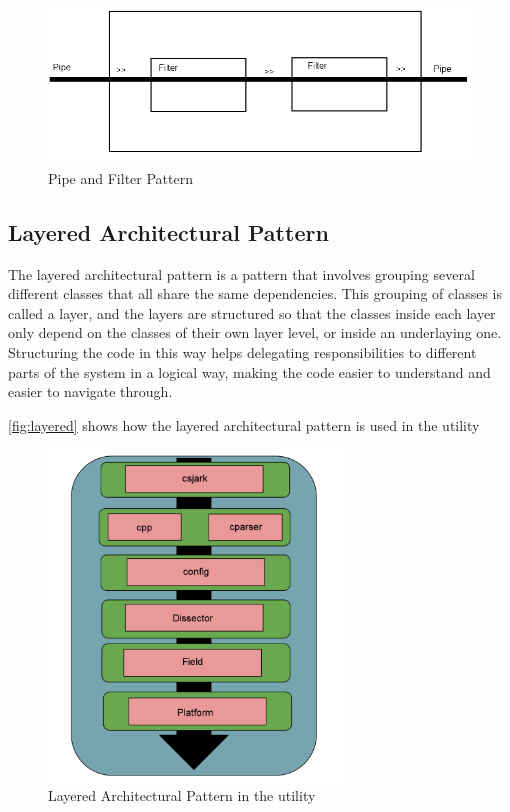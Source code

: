 \begin{figure}[htb]
	\includegraphics[width=\textwidth]{./planning/img/PipeAndFilter}
	\caption{Pipe and Filter Pattern\label{fig:pipefilter}}
\end{figure}

\subsection{Layered Architectural Pattern}
\label{sec:Layered}
The layered architectural pattern is a pattern that involves grouping several different classes that all share the same dependencies. This grouping of classes is called a layer, and the layers are structured so that the classes inside each layer only depend on the classes of their own layer level, or inside an underlaying one. Structuring the code in this way helps delegating responsibilities to different parts of the system in a logical way, making the code easier to understand and easier to navigate through.

\autoref{fig:layered} shows how the layered architectural pattern is used in the \gls{utility}

\begin{figure}[htb]
	\center
	\includegraphics[width=0.7\textwidth]{./planning/img/layered}
	\caption{Layered Architectural Pattern in the \Gls{utility}\label{fig:layered}}
\end{figure}


